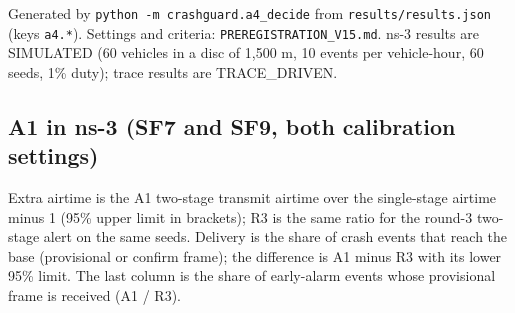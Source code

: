 


Generated by \texttt{python -m crashguard.a4\_decide} from \texttt{results/results.json} (keys \texttt{a4.*}). Settings and criteria: \texttt{PREREGISTRATION\_V15.md}. ns-3 results are SIMULATED (60 vehicles in a disc of 1,500 m, 10 events per vehicle-hour, 60 seeds, 1\% duty); trace results are TRACE\_DRIVEN.

\subsection*{A1 in ns-3 (SF7 and SF9, both calibration settings)}

Extra airtime is the A1 two-stage transmit airtime over the single-stage airtime minus 1 (95\% upper limit in brackets); R3 is the same ratio for the round-3 two-stage alert on the same seeds. Delivery is the share of crash events that reach the base (provisional or confirm frame); the difference is A1 minus R3 with its lower 95\% limit. The last column is the share of early-alarm events whose provisional frame is received (A1 / R3).

